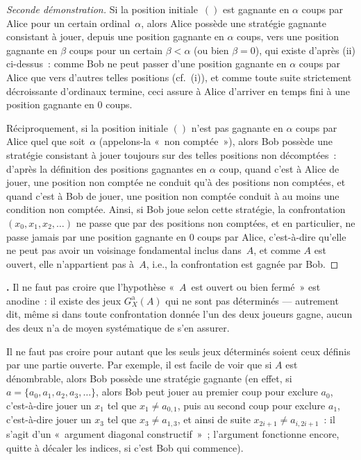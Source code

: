 \documentclass[12pt,a4paper]{article}
\theoremstyle{definition}
\newcommand\thingy{%
\refstepcounter{comcnt}\smallskip\noindent\textbf{\thecomcnt.} }
\begin{document}
\begin{proof}[Seconde démonstration]
Si la position initiale $()$ est gagnante en $\alpha$ coups par Alice
pour un certain ordinal $\alpha$, alors Alice possède une stratégie
gagnante consistant à jouer, depuis une position gagnante en $\alpha$
coups, vers une position gagnante en $\beta$ coups pour un certain
$\beta < \alpha$ (ou bien $\beta = 0$), qui existe d'après (ii)
ci-dessus : comme Bob ne peut passer d'une position gagnante en
$\alpha$ coups par Alice que vers d'autres telles positions (cf. (i)),
et comme toute suite strictement décroissante d'ordinaux termine, ceci
assure à Alice d'arriver en temps fini à une position gagnante en $0$
coups.

Réciproquement, si la position initiale $()$ n'est pas gagnante en
$\alpha$ coups par Alice quel que soit $\alpha$ (appelons-la « non
  comptée »), alors Bob possède une stratégie consistant à jouer
toujours sur des telles positions non décomptées : d'après la
définition des positions gagnantes en $\alpha$ coup, quand c'est à
Alice de jouer, une position non comptée ne conduit qu'à des positions
non comptées, et quand c'est à Bob de jouer, une position non comptée
conduit à au moins une condition non comptée.  Ainsi, si Bob joue
selon cette stratégie, la confrontation $(x_0,x_1,x_2,\ldots)$ ne
passe que par des positions non comptées, et en particulier, ne passe
jamais par une position gagnante en $0$ coups par Alice, c'est-à-dire
qu'elle ne peut pas avoir un voisinage fondamental inclus dans $A$, et
comme $A$ est ouvert, elle n'appartient pas à $A$, i.e., la
confrontation est gagnée par Bob.
\end{proof}

\thingy Il ne faut pas croire que l'hypothèse « $A$ est ouvert ou bien
  fermé » est anodine : il existe des jeux $G_X^{\mathrm{a}}(A)$ qui
ne sont pas déterminés — autrement dit, même si dans toute
confrontation donnée l'un des deux joueurs gagne, aucun des deux n'a
de moyen systématique de s'en assurer.

Il ne faut pas croire pour autant que les seuls jeux déterminés soient
ceux définis par une partie ouverte.  Par exemple, il est facile de
voir que si $A$ est dénombrable, alors Bob possède une stratégie
gagnante (en effet, si $a = \{a_0,a_1,a_2,a_3,\ldots\}$, alors Bob
peut jouer au premier coup pour exclure $a_0$, c'est-à-dire jouer un
$x_1$ tel que $x_1 \neq a_{0,1}$, puis au second coup pour exclure
$a_1$, c'est-à-dire jouer un $x_3$ tel que $x_3 \neq a_{1,3}$, et
ainsi de suite $x_{2i+1} \neq a_{i,2i+1}$ : il s'agit d'un « argument
  diagonal constructif » ; l'argument fonctionne encore, quitte à
décaler les indices, si c'est Bob qui commence).
\end{document}
